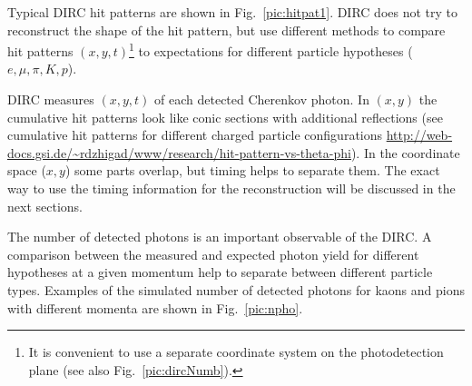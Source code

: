 Typical \gluex DIRC hit patterns are shown in Fig.~\ref{pic:hitpat1}. DIRC does not try to reconstruct the shape of the hit pattern, but use different methods to compare hit patterns $(x,y,t)$\footnote{It is convenient to use a separate coordinate system on the photodetection plane (see also Fig.~\ref{pic:dircNumb}).} 
to expectations for different particle hypotheses ($e, \mu, \pi, K, p$).



DIRC measures $(x,y,t)$ of each detected Cherenkov photon. In $(x,y)$ the cumulative hit patterns look like conic sections with additional reflections (see cumulative hit patterns for different charged particle configurations \url{http://web-docs.gsi.de/~rdzhigad/www/research/hit-pattern-vs-theta-phi}). In the coordinate space ($x ,y$) some parts overlap, but timing helps to separate them.
The exact way to use the timing information for the reconstruction will be discussed in the next sections.

The number of detected photons is an important observable of the DIRC. A comparison between the measured and expected photon yield for different hypotheses at a given momentum help to separate between different particle types. Examples of the simulated number of detected photons for kaons and pions with different momenta are shown in Fig.~\ref{pic:npho}.

